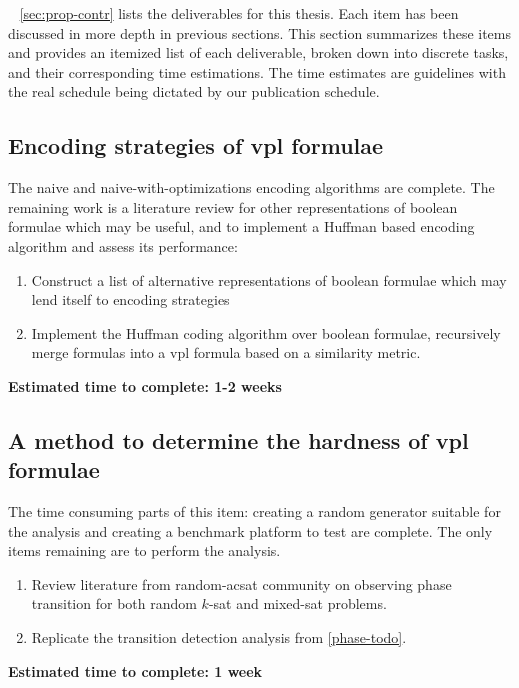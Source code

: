 ~\label{sec:research-plan}
\autoref{sec:prop-contr} lists the deliverables for this thesis. Each item has
been discussed in more depth in previous sections. This section summarizes these
items and provides an itemized list of each deliverable, broken down into
discrete tasks, and their corresponding time estimations. The time estimates are
guidelines with the real schedule being dictated by our publication schedule.

\subsection{Encoding strategies of \ac{vpl} formulae}
The naive and naive-with-optimizations encoding algorithms are complete. The
remaining work is a literature review for other representations of boolean
formulae which may be useful, and to implement a Huffman based encoding
algorithm and assess its performance:

\begin{enumerate}
\item Construct a list of alternative representations of boolean formulae which
  may lend itself to encoding strategies
\item\label{huffman-todo} Implement the Huffman coding algorithm over boolean
  formulae, recursively merge formulas into a \ac{vpl} formula based on a
  similarity metric.
\end{enumerate}

\textbf{Estimated time to complete: 1-2 weeks}

\subsection{A method to determine the hardness of \ac{vpl} formulae}
The time consuming parts of this item: creating a random generator suitable for
the analysis and creating a benchmark platform to test are complete. The only
items remaining are to perform the analysis.

\begin{enumerate}
\item\label{phase-todo} Review literature from random-ac{sat} community on observing phase
  transition for both random $k$-\ac{sat} and mixed-\ac{sat} problems.
\item Replicate the transition detection analysis from \autoref{phase-todo}.
\end{enumerate}

\textbf{Estimated time to complete: 1 week}


